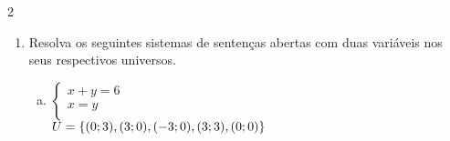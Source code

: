 \documentclass[a4paper,14pt]{article}
\begin{document}
\begin{multicols}{2}
\begin{enumerate}
\begin{enumerate}[a)]
                \item $a^b = 27$\\
                $U = \{(3;-3),(-\sqrt{3};6),(\sqrt{3};6),\\(3;3),(3^{-1};-3)\}$\\\\\\\\\\\\\\\\\\\\\\\\\\\\\\\\
                \item $x > 0$\\
                $U = \{-2, 0, 2 \} \times \{-3, -2, 0\}$\\\\\\\\\\\\\\\\\\\\\\\\\\\\
            \end{enumerate}
            \item Resolva os seguintes sistemas de sentenças abertas com duas variáveis nos seus respectivos universos.\\
            \begin{enumerate}[a)]
            	\item $
            	\begin{cases}
            		x + y = 6 \\
            		x = y \\
            	\end{cases}$	\\
                $U = \{(0;3),(3;0),(-3;0),\\(3;3),(0;0)\}
            	$\\\\\\\\\\\\\\\\\\\\\\\\\\\\

\end{enumerate}
\end{enumerate}
\end{multicols}
\end{document}
